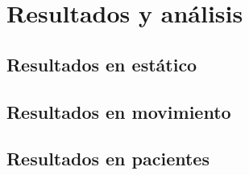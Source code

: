 \chapter{Resultados y análisis\label{sec:resultados}}

\section{Resultados en estático}

\section{Resultados en movimiento}

\section{Resultados en pacientes}